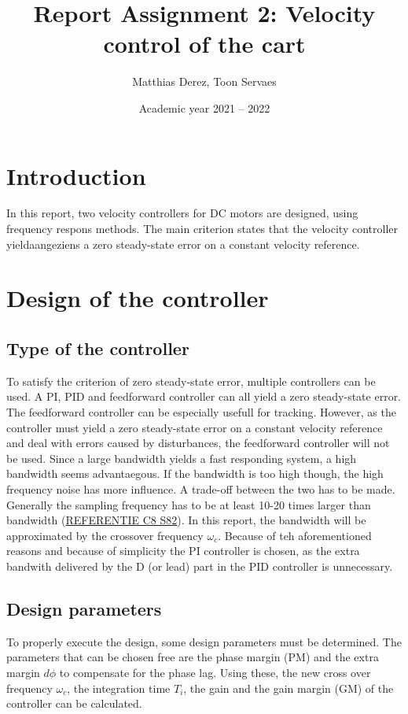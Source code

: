 \documentclass[a4paper,kul]{kulakarticle} %
\date{Academic year 2021 -- 2022}
\title{Report Assignment 2: Velocity control of the cart}
\author{Matthias Derez, Toon Servaes}
\begin{document}
\maketitle
\section{Introduction}
In this report, two velocity controllers for DC motors are designed, using frequency respons methods. The main criterion states that the velocity controller yieldaangeziens a zero steady-state error on a constant velocity reference. 
\section{Design of the controller}
\subsection{Type of the controller}
To satisfy the criterion of zero steady-state error, multiple controllers can be used. A PI, PID and feedforward controller can all yield a zero steady-state error. The feedforward controller can be especially usefull for tracking. However, as the controller must yield a zero steady-state error on a constant velocity reference and deal with errors caused by disturbances, the feedforward controller will not be used. Since a large bandwidth yields a fast responding system, a high bandwidth seems advantaegous. If the bandwidth is too high though, the high frequency noise has more influence. A trade-off between the two has to be made. Generally the sampling frequency has to be at least 10-20 times larger than bandwidth (\underline{REFERENTIE C8 S82}). In this report, the bandwidth will be approximated by the crossover frequency $\omega_c$. Because of teh aforementioned reasons and because of simplicity the PI controller is chosen, as the extra bandwith delivered by the D (or lead) part in the PID controller is unnecessary.  
\subsection{Design parameters}
To properly execute the design, some design parameters must be determined. The parameters that can be chosen free are the phase margin (PM) and the extra margin $d\phi$ to compensate for the phase lag. Using these, the new cross over frequency $\omega_c$, the integration time $T_i$, the gain and the gain margin (GM) of the controller can be calculated. 
\end{document}
